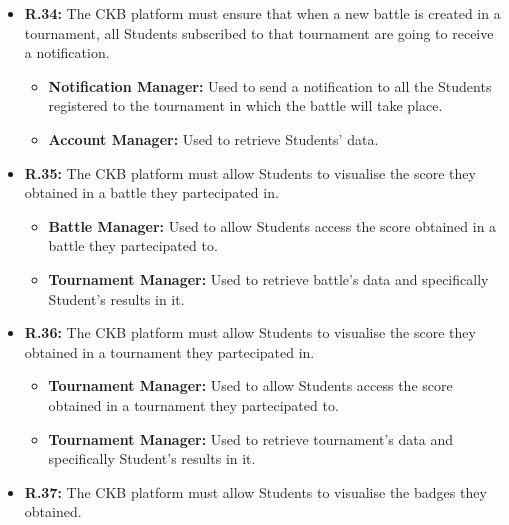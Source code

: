 \documentclass{article}
\begin{document}
{\begin{itemize}
          \begin{itemize}
              \item \textbf{Notification Manager:} Used to send a notification to all the Students
              registered to the platform.
              \item \textbf{Account Manager:} Used to retrieve Students' data.
          \end{itemize}
    \item \textbf{R.34:} The CKB platform must ensure that when a new battle is created in a tournament,
          all Students subscribed to that tournament are going to receive a notification.
          \begin{itemize}
              \item \textbf{Notification Manager:} Used to send a notification to all the Students
              registered to the tournament in which the battle will take place.
              \item \textbf{Account Manager:} Used to retrieve Students' data.
          \end{itemize}
    \item \textbf{R.35:} The CKB platform must allow Students to visualise the score they obtained in a battle they partecipated in.
          \begin{itemize}
              \item \textbf{Battle Manager:} Used to allow Students access the score obtained
              in a battle they partecipated to.
              \item \textbf{Tournament Manager:} Used to retrieve battle's data and specifically
              Student's results in it.
          \end{itemize}
    \item \textbf{R.36:} The CKB platform must allow Students to visualise the score they obtained in a tournament they partecipated in.
          \begin{itemize}
            \item \textbf{Tournament Manager:} Used to allow Students access the score obtained
            in a tournament they partecipated to.
            \item \textbf{Tournament Manager:} Used to retrieve tournament's data and specifically Student's results in it.
          \end{itemize}
    \item \textbf{R.37:} The CKB platform must allow Students to visualise the badges they obtained.
          \begin{itemize}

\end{itemize}
\end{itemize}}
\end{document}
